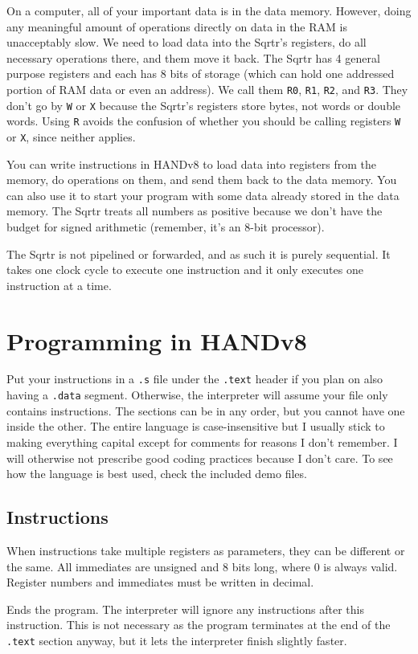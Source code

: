 \documentclass[12pt, oneside]{memoir}
\newcommand{\R}[1]{{\color{register}\texttt{R#1}}}
\newcommand{\imm}{{\color{imm}\texttt{imm8}}}
\newcommand{\instruction}[1]{{\color{instruction}\texttt{#1}}}
\newcommand{\header}[1]{{\color{header}\texttt{#1}}}
\begin{document}
On a computer, all of your important data is in the data memory. However, doing any meaningful amount of operations directly on data in the RAM is unacceptably slow. We need to load data into the Sqrtr's registers, do all necessary operations there, and them move it back. The Sqrtr has 4 general purpose registers and each has 8 bits of storage (which can hold one addressed portion of RAM data or even an address). We call them \R{0}, \R{1}, \R{2}, and \R{3}. They don't go by \texttt{W} or \texttt{X} because the Sqrtr's registers store bytes, not words or double words. Using \texttt{R} avoids the confusion of whether you should be calling registers \texttt{W} or \texttt{X}, since neither applies.

You can write instructions in HANDv8 to load data into registers from the memory, do operations on them, and send them back to the data memory. You can also use it to start your program with some data already stored in the data memory. The Sqrtr treats all numbers as positive because we don't have the budget for signed arithmetic (remember, it's an 8-bit processor).

The Sqrtr is not pipelined or forwarded, and as such it is purely sequential. It takes one clock cycle to execute one instruction and it only executes one instruction at a time.

\chapter{Programming in HANDv8}
Put your instructions in a \texttt{.s} file under the \header{.text} header if you plan on also having a \header{.data} segment. Otherwise, the interpreter will assume your file only contains instructions. The sections can be in any order, but you cannot have one inside the other. The entire language is case-insensitive but I usually stick to making everything capital except for comments for reasons I don't remember. I will otherwise not prescribe good coding practices because I don't care. To see how the language is best used, check the included demo files.

\section{Instructions}
When instructions take multiple registers as parameters, they can be different or the same. All immediates are unsigned and 8 bits long, where 0 is always valid. Register numbers and immediates must be written in decimal. 
\begin{description}[leftmargin=!,labelwidth=\widthof{\bfseries\instruction{DIV} \R{w} \R{a} \imm}]
    \item[\instruction{END}] Ends the program. The interpreter will ignore any instructions after this instruction. This is not necessary as the program terminates at the end of the \header{.text} section anyway, but it lets the interpreter finish slightly faster.
\end{description}
\end{document}
